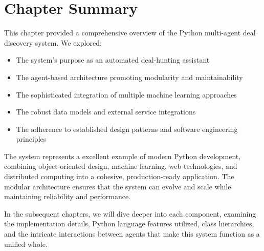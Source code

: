 \section{Chapter Summary}

This chapter provided a comprehensive overview of the Python multi-agent deal discovery system. We explored:

\begin{itemize}
\item The system's purpose as an automated deal-hunting assistant
\item The agent-based architecture promoting modularity and maintainability  
\item The sophisticated integration of multiple machine learning approaches
\item The robust data models and external service integrations
\item The adherence to established design patterns and software engineering principles
\end{itemize}

The system represents a excellent example of modern Python development, combining object-oriented design, machine learning, web technologies, and distributed computing into a cohesive, production-ready application. The modular architecture ensures that the system can evolve and scale while maintaining reliability and performance.

In the subsequent chapters, we will dive deeper into each component, examining the implementation details, Python language features utilized, class hierarchies, and the intricate interactions between agents that make this system function as a unified whole.